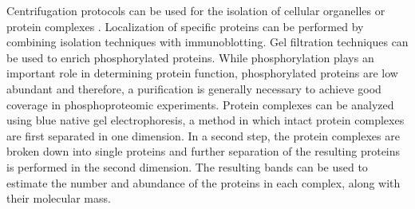 Centrifugation protocols can be used for the isolation of cellular organelles 
or protein complexes \citep{Pertoft1978}.
Localization of specific proteins can be performed by combining isolation 
techniques with immunoblotting.
Gel filtration techniques can be used to enrich phosphorylated proteins.
While phosphorylation plays an important role in determining protein function,
phosphorylated proteins are low abundant and therefore, a purification is
generally necessary to achieve good coverage in phosphoproteomic experiments.
Protein complexes can be analyzed using blue native gel electrophoresis, a 
method in which intact protein complexes are first separated in one dimension.
In a second step, the protein complexes are broken down into single proteins and
further separation of the resulting proteins is performed in the second 
dimension.
The resulting bands can be used to estimate the number and abundance of
the proteins in each complex, along with their molecular mass.



% 
% 
% 
% 

